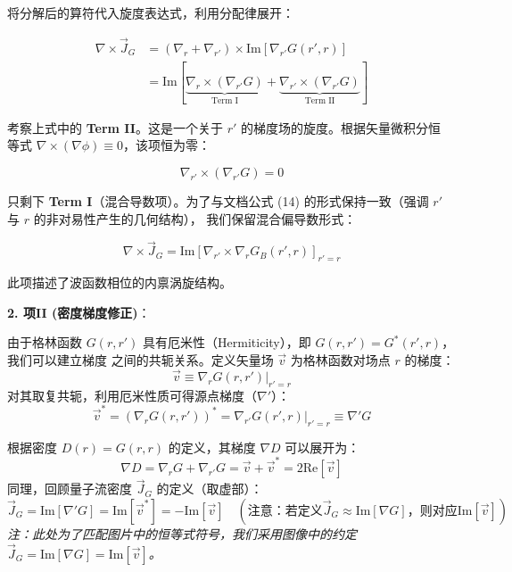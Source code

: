 \documentclass[a4paper,12pt]{article}
\begin{document}
将分解后的算符代入旋度表达式，利用分配律展开：

\begin{equation}
    \begin{aligned}
        \nabla \times \vec{J}_G &= (\nabla_r + \nabla_{r'}) \times \text{Im} \left[ \nabla_{r'} G(r', r) \right] \\
        &= \text{Im} \left[ \underbrace{\nabla_r \times (\nabla_{r'} G)}_{\text{Term I}} + \underbrace{\nabla_{r'} \times (\nabla_{r'} G)}_{\text{Term II}} \right]
    \end{aligned}
\end{equation}


考察上式中的 \textbf{Term II}。这是一个关于 $r'$ 的梯度场的旋度。根据矢量微积分恒
等式 $\nabla \times (\nabla \phi) \equiv 0$，该项恒为零：

\begin{equation}
    \nabla_{r'} \times (\nabla_{r'} G) = 0
\end{equation}

只剩下 \textbf{Term I}（混合导数项）。为了与文档公式 (14) 的形式保持一致（强调 $r'$ 与 $r$ 的非对易性产生的几何结构），
我们保留混合偏导数形式：

\begin{equation}
    \nabla \times \vec{J}_G = \text{Im} \left[ \nabla_{r'} \times \nabla_r G_B(r', r) \right]_{r'=r}
\end{equation}

此项描述了波函数相位的内禀涡旋结构。

\textbf{2. 项II (密度梯度修正)}：

由于格林函数 $G(r, r')$ 具有厄米性（Hermiticity），即 $G(r, r') = G^*(r', r)$，我们可以建立梯度
之间的共轭关系。定义矢量场 $\vec{v}$ 为格林函数对场点 $r$ 的梯度：
\begin{equation}
    \vec{v} \equiv \nabla_r G(r, r') \Big|_{r'=r}
\end{equation}
对其取复共轭，利用厄米性质可得源点梯度（$\nabla'$）：
\begin{equation}
    \vec{v}^* = \left( \nabla_r G(r, r') \right)^* = \nabla_{r'} G(r', r) \Big|_{r'=r} \equiv \nabla' G
\end{equation}

根据密度 $D(r) = G(r, r)$ 的定义，其梯度 $\nabla D$ 可以展开为：
\begin{equation}
    \nabla D = \nabla_r G + \nabla_{r'} G = \vec{v} + \vec{v}^* = 2\text{Re}[\vec{v}]
\end{equation}
同理，回顾量子流密度 $\vec{J}_G$ 的定义（取虚部）：
\begin{equation}
    \vec{J}_G = \text{Im}[\nabla' G] = \text{Im}[\vec{v}^*] = -\text{Im}[\vec{v}] \quad (\text{注意：若定义} \vec{J}_G \approx \text{Im}[\nabla G] \text{，则对应} \text{Im}[\vec{v}])
\end{equation}
\textit{注：此处为了匹配图片中的恒等式符号，我们采用图像中的约定 $\vec{J}_G = \text{Im}[\nabla G] = \text{Im}[\vec{v}]$。}
\end{document}
